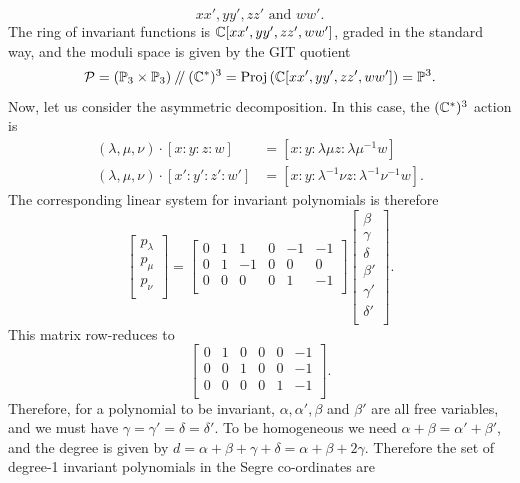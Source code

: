 	\begin{equation}
		xx', yy', zz' \text{ and } ww'.
	\end{equation}
	The ring of invariant functions is $\mathbb{C}[xx',yy',zz',ww']$, graded in the standard way, and the moduli space is given by the GIT quotient
	\begin{equation}
		\mathcal{P} = (\mathbb{P}_3 \times \mathbb{P}_3)\mathbin{/\mkern-4mu/} (\mathbb{C}^\ast)^3 = \text{Proj} \left(\mathbb{C}[xx',yy',zz',ww']\right) = \mathbb{P}^3.
	\end{equation}
	Now, let us consider the asymmetric decomposition. In this case, the $(\mathbb{C}^\ast)^3$ action is
	\begin{align*}
	(\lambda, \mu,\nu)\cdot [x:y:z:w] &= [x:y: \lambda \mu z: \lambda\mu^{-1} w]\\
	(\lambda, \mu,\nu)\cdot [x':y':z':w'] &= [x: y: \lambda^{-1} \nu z: \lambda^{-1}\nu^{-1} w].
	\end{align*}
	The corresponding linear system for invariant polynomials is therefore
		\begin{equation}
	\begin{bmatrix}
	p_\lambda \\
	p_\mu \\
	p_\nu \\
	\end{bmatrix} = \begin{bmatrix}
	0 & 1 & 1 & 0 & -1 & -1\\
	0 & 1 & -1 & 0 & 0 & 0\\
	0 & 0 & 0 & 0 & 1 & -1\\
	\end{bmatrix}\begin{bmatrix}
	\beta \\
	\gamma \\
	\delta \\
	\beta' \\
	\gamma'\\
	\delta '\\
	\end{bmatrix}.
	\end{equation}
	This matrix row-reduces to 
	\begin{equation}
		\begin{bmatrix}
		0 & 1 & 0 & 0 & 0 & -1\\
		0 & 0 & 1 & 0 & 0 & -1\\
		0 & 0 & 0 & 0 & 1 & -1\\
		\end{bmatrix}.
	\end{equation}
	Therefore, for a polynomial to be invariant, $\alpha, \alpha', \beta$ and $\beta'$ are all free variables, and we must have $\gamma = \gamma' = \delta = \delta'$. To be homogeneous we need $\alpha + \beta = \alpha' + \beta'$, and the degree is given by $d = \alpha + \beta + \gamma + \delta = \alpha + \beta + 2\gamma$. Therefore the set of degree-1 invariant polynomials in the Segre co-ordinates are
